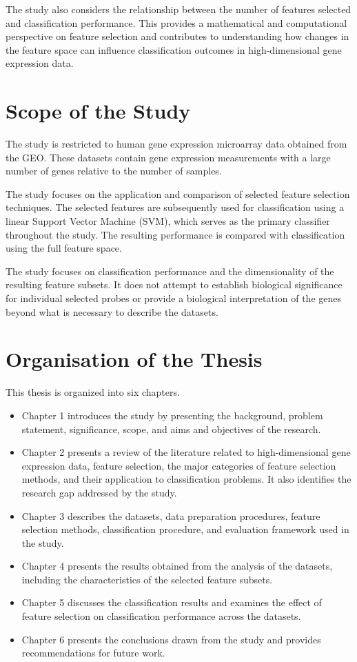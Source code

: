 The study also considers the relationship between the number of features selected and classification performance. This provides a mathematical and computational perspective on feature selection and contributes to understanding how changes in the feature space can influence classification outcomes in high-dimensional gene expression data.

\section{Scope of the Study}
The study is restricted to human gene expression microarray data obtained from the GEO. These datasets contain gene expression measurements with a large number of genes relative to the number of samples.

The study focuses on the application and comparison of selected feature selection techniques. The selected features are subsequently used for classification using a linear Support Vector Machine (SVM), which serves as the primary classifier throughout the study. The resulting performance is compared with classification using the full feature space.

The study focuses on classification performance and the dimensionality of the resulting feature subsets. It does not attempt to establish biological significance for individual selected probes or provide a biological interpretation of the genes beyond what is necessary to describe the datasets.

\section{Organisation of the Thesis}
This thesis is organized into six chapters. 

\begin{itemize}
    \item Chapter 1 introduces the study by presenting the background, problem statement, significance, scope, and aims and objectives of the research.

\item Chapter 2 presents a review of the literature related to high-dimensional gene expression data, feature selection, the major categories of feature selection methods, and their application to classification problems. It also identifies the research gap addressed by the study.

\item Chapter 3 describes the datasets, data preparation procedures, feature selection methods, classification procedure, and evaluation framework used in the study.

\item Chapter 4 presents the results obtained from the analysis of the datasets, including the characteristics of the selected feature subsets.

\item Chapter 5 discusses the classification results and examines the effect of feature selection on classification performance across the datasets.

\item Chapter 6 presents the conclusions drawn from the study and provides recommendations for future work.
\end{itemize}
